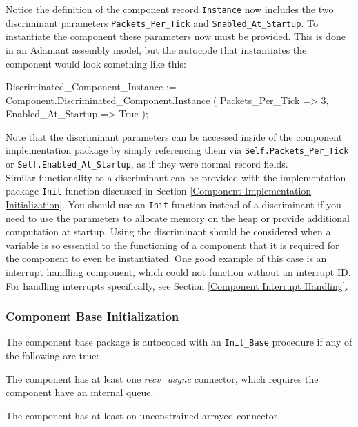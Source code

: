 Notice the definition of the component record \texttt{Instance} now includes the two discriminant parameters \texttt{Packets\_Per\_Tick} and \texttt{Snabled\_At\_Startup}. To instantiate the component these parameters now must be provided. This is done in an Adamant assembly model, but the autocode that instantiates the component would look something like this:

\vspace{5mm} %
\begin{adacode}
  Discriminated_Component_Instance := Component.Discriminated_Component.Instance (
    Packets_Per_Tick => 3,
    Enabled_At_Startup => True
  );
\end{adacode}
\vspace{5mm} %

Note that the discriminant parameters can be accessed inside of the component implementation package by simply referencing them via \texttt{Self.Packets\_Per\_Tick} or \texttt{Self.Enabled\_At\_Startup}, as if they were normal record fields. \\

Similar functionality to a discriminant can be provided with the implementation package \texttt{Init} function discussed in Section \ref{Component Implementation Initialization}. You should use an \texttt{Init} function instead of a discriminant if you need to use the parameters to allocate memory on the heap or provide additional computation at startup. Using the discriminant should be considered when a variable is so essential to the functioning of a component that it is required for the component to even be instantiated. One good example of this case is an interrupt handling component, which could not function without an interrupt ID. For handling interrupts specifically, see Section \ref{Component Interrupt Handling}.

\subsubsection{Component Base Initialization} \label{Component Base Initialization}

The component base package is autocoded with an \texttt{Init\_Base} procedure if any of the following are true:

\vspace{5mm} %
\begin{spaceditemize}
  \item The component has at least one \textit{recv\_async} connector, which requires the component have an internal queue.
  \item The component has at least on unconstrained arrayed connector.
\end{spaceditemize}
\vspace{5mm} %

